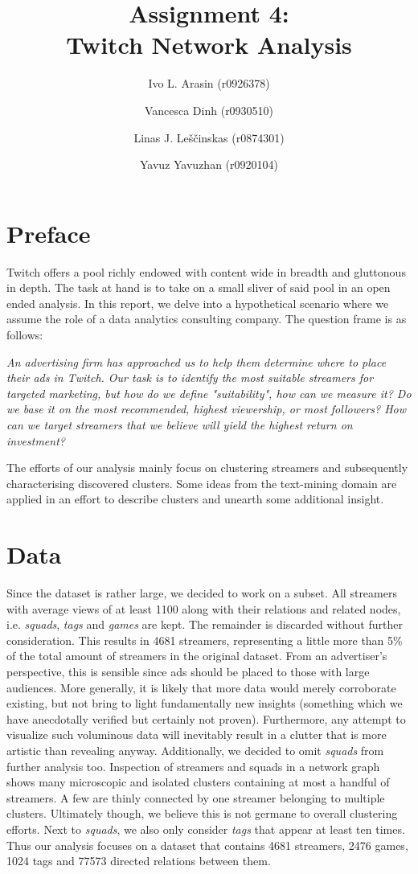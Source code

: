 \documentclass[11pt, oneside]{article}   	%
\title{Assignment 4: \\ Twitch Network Analysis}
\author{\centering Ivo L. Arasin (r0926378) \and Vancesca Dinh (r0930510) \and Linas J. Leščinskas (r0874301) \and Yavuz Yavuzhan (r0920104)}
\begin{document}
\maketitle
\section{Preface}
Twitch offers a pool richly endowed with content wide in breadth and gluttonous in depth. The task at hand is to take on a small sliver of said pool in an open ended analysis. In this report, we delve into a hypothetical scenario where we assume the role of a data analytics consulting company. The question frame is as follows: 
\begin{center}
\begin{displayquote}
\itshape %
An advertising firm has approached us to help them determine where to place their ads in Twitch. Our task is to identify the most suitable streamers for targeted marketing, but how do we define "suitability", how can we measure it? Do we base it on the most recommended, highest viewership, or most followers? How can we target streamers that we believe will yield the highest return on investment?
\end{displayquote}
\end{center}

The efforts of our analysis mainly focus on clustering streamers and subsequently characterising discovered clusters. Some ideas from the text-mining domain are applied in an effort to describe clusters and unearth some additional insight.
\section{Data}
Since the dataset is rather large, we decided to work on a subset. All streamers with average views of at least 1100 along with their relations and related nodes, i.e. \textit{squads}, \textit{tags} and \textit{games} are kept. The remainder is discarded without further consideration. This results in 4681 streamers, representing a little more than 5\% of the total amount of streamers in the original dataset. From an advertiser's perspective, this is sensible since ads should be placed to those with large audiences. More generally, it is likely that more data would merely corroborate existing, but not bring to light fundamentally new insights (something which we have anecdotally verified but certainly not proven). Furthermore, any attempt to visualize such voluminous data will inevitably result in a clutter that is more artistic than revealing anyway.
\newline
Additionally, we decided to omit \textit{squads} from further analysis too. Inspection of streamers and squads in a network graph shows many microscopic and isolated clusters containing at most a handful of streamers. A few are thinly connected by one streamer belonging to multiple clusters.
Ultimately though, we believe this is not germane to overall clustering efforts.
Next to \textit{squads}, we also only consider \textit{tags} that appear at least ten times.
\newline
Thus our analysis focuses on a dataset that contains 4681 streamers, 2476 games, 1024 tags and 77573 directed relations between them.
\end{document}
